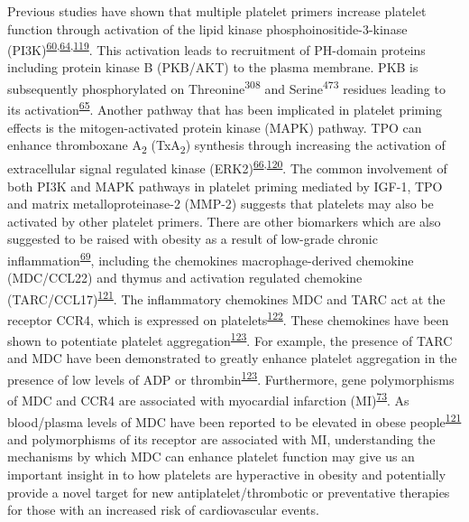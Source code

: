 \documentclass[11pt,twoside]{bristolthesis}
\begin{document}
Previous studies have shown that multiple platelet primers increase platelet function through activation of the lipid kinase phosphoinositide-3-kinase (PI3K)\textsuperscript{\protect\hyperlink{ref-Blair2015}{60},\protect\hyperlink{ref-Pasquet2000}{64},\protect\hyperlink{ref-Falcinelli2005}{119}}. This activation leads to recruitment of PH-domain proteins including protein kinase B (PKB/AKT) to the plasma membrane. PKB is subsequently phosphorylated on Threonine\textsuperscript{308} and Serine\textsuperscript{473} residues leading to its activation\textsuperscript{\protect\hyperlink{ref-Hemmings2015}{65}}. Another pathway that has been implicated in platelet priming effects is the mitogen-activated protein kinase (MAPK) pathway. TPO can enhance thromboxane A\textsubscript{2} (TxA\textsubscript{2}) synthesis through increasing the activation of extracellular signal regulated kinase (ERK2)\textsuperscript{\protect\hyperlink{ref-Ezumi1998}{66},\protect\hyperlink{ref-VanWilligen2000}{120}}. The common involvement of both PI3K and MAPK pathways in platelet priming mediated by IGF-1, TPO and matrix metalloproteinase-2 (MMP-2) suggests that platelets may also be activated by other platelet primers. There are other biomarkers which are also suggested to be raised with obesity as a result of low-grade chronic inflammation\textsuperscript{\protect\hyperlink{ref-Esser2014}{69}}, including the chemokines macrophage-derived chemokine (MDC/CCL22) and thymus and activation regulated chemokine (TARC/CCL17)\textsuperscript{\protect\hyperlink{ref-Safa2016}{121}}. The inflammatory chemokines MDC and TARC act at the receptor CCR4, which is expressed on platelets\textsuperscript{\protect\hyperlink{ref-Clemetson2000}{122}}. These chemokines have been shown to potentiate platelet aggregation\textsuperscript{\protect\hyperlink{ref-Gear2001}{123}}. For example, the presence of TARC and MDC have been demonstrated to greatly enhance platelet aggregation in the presence of low levels of ADP or thrombin\textsuperscript{\protect\hyperlink{ref-Gear2001}{123}}. Furthermore, gene polymorphisms of MDC and CCR4 are associated with myocardial infarction (MI)\textsuperscript{\protect\hyperlink{ref-Noori2018}{73}}. As blood/plasma levels of MDC have been reported to be elevated in obese people\textsuperscript{\protect\hyperlink{ref-Safa2016}{121}} and polymorphisms of its receptor are associated with MI, understanding the mechanisms by which MDC can enhance platelet function may give us an important insight in to how platelets are hyperactive in obesity and potentially provide a novel target for new antiplatelet/thrombotic or preventative therapies for those with an increased risk of cardiovascular events.
\end{document}
